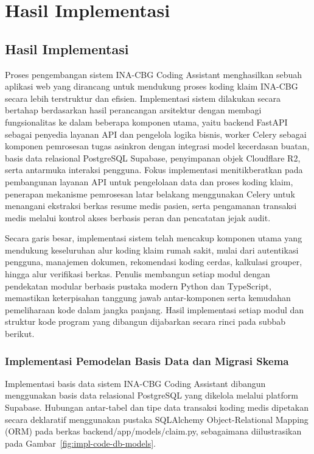 \chapter{Hasil Implementasi}

\section{Hasil Implementasi}
Proses pengembangan sistem INA-CBG Coding Assistant menghasilkan sebuah aplikasi web yang dirancang untuk mendukung proses koding klaim INA-CBG secara lebih terstruktur dan efisien. Implementasi sistem dilakukan secara bertahap berdasarkan hasil perancangan arsitektur dengan membagi fungsionalitas ke dalam beberapa komponen utama, yaitu backend FastAPI sebagai penyedia layanan API dan pengelola logika bisnis, worker Celery sebagai komponen pemrosesan tugas asinkron dengan integrasi model kecerdasan buatan, basis data relasional PostgreSQL Supabase, penyimpanan objek Cloudflare R2, serta antarmuka interaksi pengguna. Fokus implementasi menitikberatkan pada pembangunan layanan API untuk pengelolaan data dan proses koding klaim, penerapan mekanisme pemrosesan latar belakang menggunakan Celery untuk menangani ekstraksi berkas resume medis pasien, serta pengamanan transaksi medis melalui kontrol akses berbasis peran dan pencatatan jejak audit.

Secara garis besar, implementasi sistem telah mencakup komponen utama yang mendukung keseluruhan alur koding klaim rumah sakit, mulai dari autentikasi pengguna, manajemen dokumen, rekomendasi koding cerdas, kalkulasi grouper, hingga alur verifikasi berkas. Penulis membangun setiap modul dengan pendekatan modular berbasis pustaka modern Python dan TypeScript, memastikan keterpisahan tanggung jawab antar-komponen serta kemudahan pemeliharaan kode dalam jangka panjang. Hasil implementasi setiap modul dan struktur kode program yang dibangun dijabarkan secara rinci pada subbab berikut.

\subsection{Implementasi Pemodelan Basis Data dan Migrasi Skema}
Implementasi basis data sistem INA-CBG Coding Assistant dibangun menggunakan basis data relasional PostgreSQL yang dikelola melalui platform Supabase. Hubungan antar-tabel dan tipe data transaksi koding medis dipetakan secara deklaratif menggunakan pustaka SQLAlchemy Object-Relational Mapping (ORM) pada berkas backend/app/models/claim.py, sebagaimana diilustrasikan pada Gambar~\ref{fig:impl-code-db-models}.


